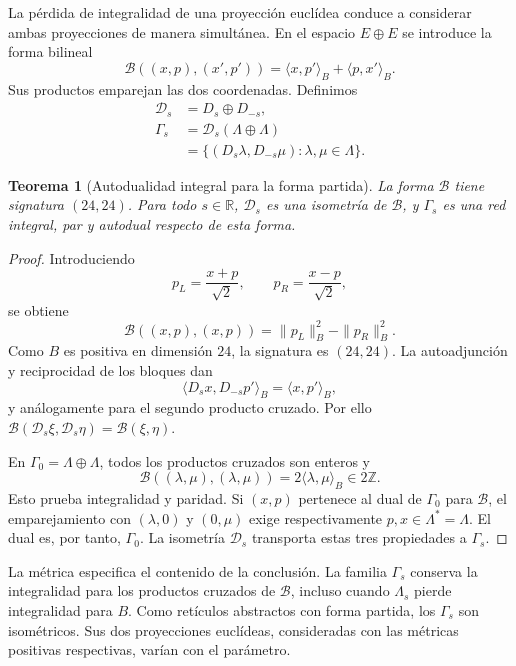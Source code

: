 \documentclass[a4paper,10pt]{article}
\newtheorem{theorem}{Teorema}[section]
\theoremstyle{definition}\newtheorem{definition}[theorem]{Definición}
\theoremstyle{remark}\newtheorem{remark}[theorem]{Observación}
\numberwithin{equation}{section}
\begin{document}
La pérdida de integralidad de una proyección euclídea conduce a
considerar ambas proyecciones de manera simultánea. En el espacio
\(E\oplus E\) se introduce la forma bilineal
\begin{equation}
 \mathcal B((x,p),(x',p'))=
       \langle x,p'\rangle_B+\langle p,x'\rangle_B.
 \label{eq:leech-split-form}
\end{equation}
Sus productos emparejan las dos coordenadas. Definimos
\begin{equation}
\begin{split}
 \mathcal D_s&=D_s\oplus D_{-s},\\
 \Gamma_s&=\mathcal D_s(\Lambda\oplus\Lambda)\\
 &=\{(D_s\lambda,D_{-s}\mu):\lambda,\mu\in\Lambda\}.
\end{split}
\label{eq:leech-split-lattice}
\end{equation}

\begin{theorem}[Autodualidad integral para la forma partida]
\label{thm:leech-split}
La forma \(\mathcal B\) tiene signatura \((24,24)\).
Para todo \(s\in\mathbb R\), \(\mathcal D_s\) es una isometría de
\(\mathcal B\), y \(\Gamma_s\) es una red integral, par y autodual
respecto de esta forma.
\end{theorem}
\begin{proof}
Introduciendo
\[
 p_L=\frac{x+p}{\sqrt2},\qquad
 p_R=\frac{x-p}{\sqrt2},
\]
se obtiene
\[
 \mathcal B((x,p),(x,p))=\|p_L\|_B^2-\|p_R\|_B^2.
\]
Como \(B\) es positiva en dimensión \(24\), la signatura es
\((24,24)\). La autoadjunción y reciprocidad de los bloques dan
\[
 \langle D_sx,D_{-s}p'\rangle_B=\langle x,p'\rangle_B,
\]
y análogamente para el segundo producto cruzado. Por ello
\(\mathcal B(\mathcal D_s\xi,\mathcal D_s\eta)=\mathcal B(\xi,\eta)\).

En \(\Gamma_0=\Lambda\oplus\Lambda\), todos los productos cruzados
son enteros y
\[
 \mathcal B((\lambda,\mu),(\lambda,\mu))
   =2\langle\lambda,\mu\rangle_B\in2\mathbb Z.
\]
Esto prueba integralidad y paridad. Si \((x,p)\) pertenece al dual
de \(\Gamma_0\) para \(\mathcal B\), el emparejamiento con
\((\lambda,0)\) y \((0,\mu)\) exige respectivamente
\(p,x\in\Lambda^*=\Lambda\). El dual es, por tanto, \(\Gamma_0\).
La isometría \(\mathcal D_s\) transporta estas tres propiedades
a \(\Gamma_s\).
\end{proof}

La métrica especifica el contenido de la conclusión. La familia
\(\Gamma_s\) conserva la integralidad para los productos cruzados
de \(\mathcal B\), incluso cuando \(\Lambda_s\) pierde integralidad
para \(B\). Como retículos abstractos con forma partida, los
\(\Gamma_s\) son isométricos. Sus dos proyecciones euclídeas,
consideradas con las métricas positivas respectivas, varían con
el parámetro.
\end{document}
